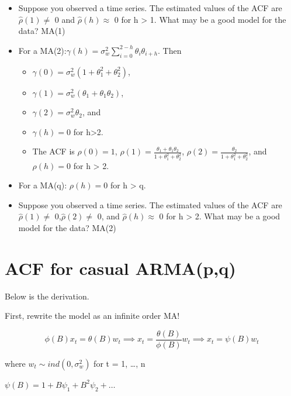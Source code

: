 \documentclass[
]{book}
\providecommand{\tightlist}{%
  \setlength{\itemsep}{0pt}\setlength{\parskip}{0pt}}
\theoremstyle{definition}
\theoremstyle{definition}
\theoremstyle{definition}
\theoremstyle{definition}
\theoremstyle{remark}
\begin{document}
\begin{itemize}
\tightlist
\item
  Suppose you observed a time series. The estimated values of the ACF are \(\hat{\rho}(1) \ne\) 0 and \(\hat{\rho}(h) \approx\) 0 for h \textgreater{} 1. What may be a good model for the data? MA(1)
\item
  For a MA(2):\(\gamma(h)=\sigma_w^2\sum_{i=0}^{2-h}\theta_i\theta_{i+h}\). Then

  \begin{itemize}
  \tightlist
  \item
    \(\gamma(0) = \sigma_w^2(1+\theta_1^2+\theta_2^2)\),
  \item
    \(\gamma(1) = \sigma_w^2(\theta_1+\theta_1\theta_2)\),
  \item
    \(\gamma(2) = \sigma_w^2\theta_2\), and
  \item
    \(\gamma(h) = 0\) for h\textgreater2.\\
  \item
    The ACF is \(\rho(0) = 1\), \(\rho(1) = \frac{\theta_1+\theta_1\theta_2}{1+\theta_1^2+\theta_2^2}\), \(\rho(2) = \frac{\theta_2}{1+\theta_1^2+\theta_2^2}\), and \(\rho(h) = 0\) for h \textgreater{} 2.\\
  \end{itemize}
\item
  For a MA(q): \(\rho(h) = 0\) for h \textgreater{} q.\\
\item
  Suppose you observed a time series. The estimated values of the ACF are \(\hat{\rho}(1) \ne\) 0,\(\hat{\rho}(2) \ne\) 0, and \(\hat{\rho}(h) \approx\) 0 for h \textgreater{} 2. What may be a good model for the data? MA(2)
\end{itemize}

\hypertarget{acf-for-casual-armapq}{%
\section{ACF for casual ARMA(p,q)}\label{acf-for-casual-armapq}}

Below is the derivation.

First, rewrite the model as an infinite order MA!

\[\phi(B)x_t = \theta(B)w_t \implies x_t = \frac{\theta(B)}{\phi(B)}w_t \implies x_t = \psi(B)w_t\]

where \(w_t \sim ind(0,\sigma_w^2)\) for t = 1, \ldots, n

\(\psi(B) = 1 + B\psi_1 + B^2\psi_2 + …\)
\end{document}
